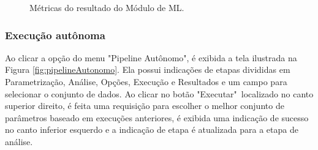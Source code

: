 \documentclass[portugues]{ic-tese}
\begin{document}
\begin{figure}[H]
    \centering
    \caption{Métricas do resultado do Módulo de ML.}
    \label{fig:pipelineManualMetricas}
\end{figure}

\subsubsection{Execução autônoma}

Ao clicar a opção do menu "Pipeline Autônomo", é exibida a tela ilustrada na Figura \ref{fig:pipelineAutonomo}. Ela possui indicações de etapas divididas em Parametrização, Análise, Opções, Execução e Resultados e um campo para selecionar o conjunto de dados. Ao clicar no botão "Executar"~localizado no canto superior direito, é feita uma requisição para escolher o melhor conjunto de parâmetros baseado em execuções anteriores, é exibida uma indicação de sucesso no canto inferior esquerdo e a indicação de etapa é atualizada para a etapa de análise.
\end{document}
